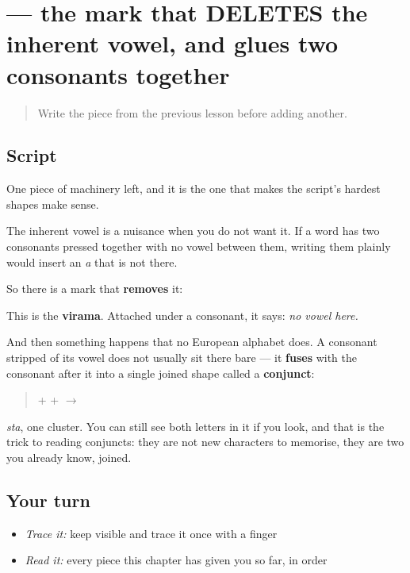\section[(virama)]{ — the mark that DELETES the inherent vowel, and glues two consonants together}

\label{lesson:GU-W01-virama}



\begin{quote}
Write the piece from the previous lesson before adding another.
\end{quote}

\subsection*{Script}
One piece of machinery left, and it is the one that makes the script's hardest shapes make sense.

The inherent vowel is a nuisance when you do not want it. If a word has two consonants pressed together with no vowel between them, writing them plainly would insert an \emph{a} that is not there.

So there is a mark that \textbf{removes} it:

\begin{quote}
\end{quote}

This is the \textbf{virama}. Attached under a consonant, it says: \emph{no vowel here.}

And then something happens that no European alphabet does. A consonant stripped of its vowel does not usually sit there bare — it \textbf{fuses} with the consonant after it into a single joined shape called a \textbf{conjunct}:

\begin{quote}
\textbf{} + \textbf{} + \textbf{} $\to$ \textbf{}
\end{quote}

\emph{sta}, one cluster. You can still see both letters in it if you look, and that is the trick to reading conjuncts: they are not new characters to memorise, they are two you already know, joined.

\subsection*{Your turn}
\begin{itemize}
\raggedright
  \item \emph{Trace it:} keep  visible and trace it once with a finger
  \item \emph{Read it:} every piece this chapter has given you so far, in order
\end{itemize}

